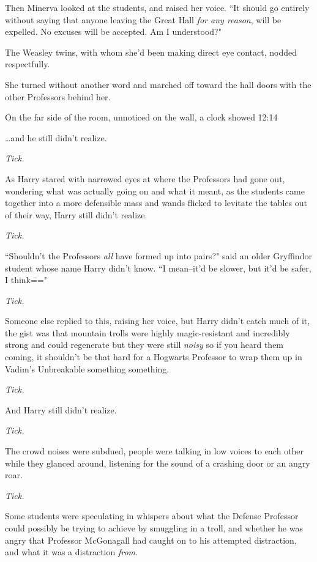 Then Minerva looked at the students, and raised her voice. ``It should go entirely without saying that anyone leaving the Great Hall \emph{for any reason}, will be expelled. No excuses will be accepted. Am I understood?"

The Weasley twins, with whom she'd been making direct eye contact, nodded respectfully.

She turned without another word and marched off toward the hall doors with the other Professors behind her.

On the far side of the room, unnoticed on the wall, a clock showed 12:14\pm

\later

{\ldots}and he still didn't realize.

\emph{Tick.}

As Harry stared with narrowed eyes at where the Professors had gone out, wondering what was actually going on and what it meant, as the students came together into a more defensible mass and wands flicked to levitate the tables out of their way, Harry still didn't realize.

\emph{Tick.}

``Shouldn't the Professors \emph{all} have formed up into pairs?" said an older Gryffindor student whose name Harry didn't know. ``I mean\---it'd be slower, but it'd be safer, I think\==="

\emph{Tick.}

Someone else replied to this, raising her voice, but Harry didn't catch much of it, the gist was that mountain trolls were highly magic-resistant and incredibly strong and could regenerate but they were still \emph{noisy} so if you heard them coming, it shouldn't be that hard for a Hogwarts Professor to wrap them up in Vadim's Unbreakable something something.

\emph{Tick.}

And Harry still didn't realize.

\emph{Tick.}

The crowd noises were subdued, people were talking in low voices to each other while they glanced around, listening for the sound of a crashing door or an angry roar.

\emph{Tick.}

Some students were speculating in whispers about what the Defense Professor could possibly be trying to achieve by smuggling in a troll, and whether he was angry that Professor McGonagall had caught on to his attempted distraction, and what it was a distraction \emph{from}.

